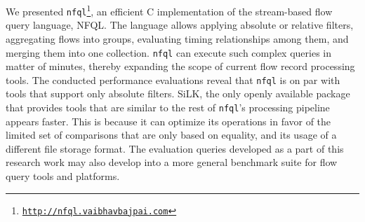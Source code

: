 We presented
\texttt{nfql}\footnote{\texttt{\url{http://nfql.vaibhavbajpai.com}}}, an
efficient C implementation of the stream-based flow query language, \ac{NFQL}.
The language allows applying absolute or relative filters, aggregating flows
into groups, evaluating timing relationships among them, and merging them into
one collection. \texttt{nfql} can execute such complex queries in matter of
minutes, thereby expanding the scope of current flow record processing tools.
The conducted performance evaluations reveal that \texttt{nfql} is on par with
tools that support only absolute filters. SiLK, the only openly available
package that provides tools that are similar to the rest of \texttt{nfql}'s
processing pipeline appears faster. This is because it can optimize its
operations in favor of the limited set of comparisons that are only based on
equality, and its usage of a different file storage format. The evaluation
queries developed as a part of this research work may also develop into a more
general benchmark suite for flow query tools and platforms.
